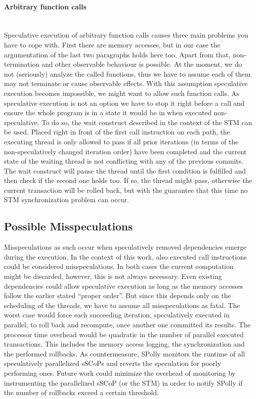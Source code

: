 \paragraph{Arbitrary function calls} ~\\
Speculative execution of arbitrary function calls causes three main problems you
have to cope with. First there are memory accesses, but in our case the
argumentation of the last two paragraphs holds here too. 
Apart from that, non-termination and other observable behaviour is possible.
At the moment, we do not (seriously) analyze the called functions, thus we have to
assume each of them may not terminate or cause  observable effects.
With this assumption speculative execution becomes impossible, 
we might want to allow such function calls. As speculative execution is not an
option we have to stop it right before a call and ensure the whole program is in a
state it would be in when executed non-speculative. To do so, the wait construct
described in the context of the STM can be used. Placed right in front of the 
first call instruction on each path,
the executing thread is only allowed to pass if  all prior iterations
(in terms of the non-speculatively changed iteration order) have been completed and the
current state of the waiting thread is not conflicting with any of the previous 
commits. The wait construct will pause the thread until the first condition is
fulfilled and then check if the second one holds too. If so, the thread might pass,
otherwise the current transaction will be rolled back, but with the guarantee that 
this time no STM synchronization problem can occur. 


\subsection{Possible Misspeculations}
Misspeculations as such occur when speculatively removed dependencies emerge during
the execution. In the context of this work, also executed call instructions could
be considered misspeculations. In both cases the current computation might be
discarded, however,  this is not always necessary. Even existing dependencies could
allow speculative execution as long as the memory accesses follow the earlier 
stated ``proper order''.
But since this depends only on the scheduling of the threads, we have to assume all 
misspeculations as fatal.
The worst case would force each succeeding iteration, speculatively 
executed in parallel, to roll back and recompute,
once another one committed its results. 
The processor time overhead would be quadratic in the number 
of parallel executed transactions. This includes the memory access logging,
the synchronization and the performed rollbacks.
As countermeasure, SPolly monitors the runtime of all speculatively parallelized
sSCoPs and reverts the speculation for poorly performing ones. Future work could
minimize the overhead of monitoring by 
instrumenting the parallelized sSCoP (or the STM) in order to notify SPolly 
if the number of rollbacks exceed a certain threshold. 

